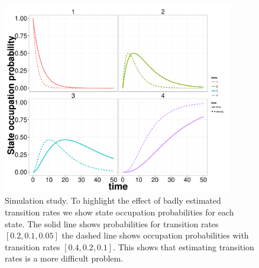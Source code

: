 \begin{figure}
  \centering
  \includegraphics[width=0.9\textwidth]{pics/wrong_w.pdf}
  \caption{Simulation study. To highlight the effect of badly estimated transition rates we show state occupation probabilities for each state. The solid line shows probabilities for transition rates $[0.2, 0.1, 0.05]$ the dashed line shows occupation probabilities with transition rates $[0.4, 0.2, 0.1]$. This shows  that estimating transition rates is a more difficult problem. }
  \label{fig:wrong_w}
\end{figure}




